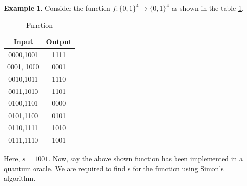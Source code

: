 \documentclass[12pt, oneside]{book}
\theoremstyle{definition}
\theoremstyle{definition}
\newtheorem{example}{Example}[section]
\theoremstyle{remark}
\begin{document}
\begin{example}
    Consider the function $f:\{0,1\}^4\rightarrow \{0,1\}^4$ as shown in the table \ref{tab:simonex2}.
    \begin{table}[H]
        \centering
        \begin{tabular}{|c|c|}
            \hline
            Input & Output \\
            \hline
            0000,1001 & 1111 \\
            0001, 1000 & 0001 \\
            0010,1011 & 1110 \\
            0011,1010 & 1101 \\
            0100,1101 & 0000 \\
            0101,1100 & 0101 \\
            0110,1111 & 1010 \\
            0111,1110 & 1001 \\
            \hline
        \end{tabular}
        \caption{Function}
        \label{tab:simonex2}
    \end{table}
    Here, $s=1001$. Now, say the above shown function has been implemented in a quantum oracle. We are required to find s for the function using Simon's algorithm.


\end{example}
\end{document}

